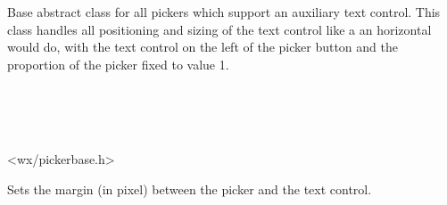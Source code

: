 
\section{}\label{wxpickerbase}

Base abstract class for all pickers which support an auxiliary text control.
This class handles all positioning and sizing of the text control like a
an horizontal  would do, with the text control on
the left of the picker button and the proportion of the picker fixed to value 1.


\\
\\
\\


<wx/pickerbase.h>


\twocolwidtha{5cm}%
\begin{twocollist}\itemsep=0pt
\end{twocollist}





\label{wxpickerbasesetinternalmargin}


Sets the margin (in pixel) between the picker and the text control.


\label{wxpickerbasegetinternalmargin}

